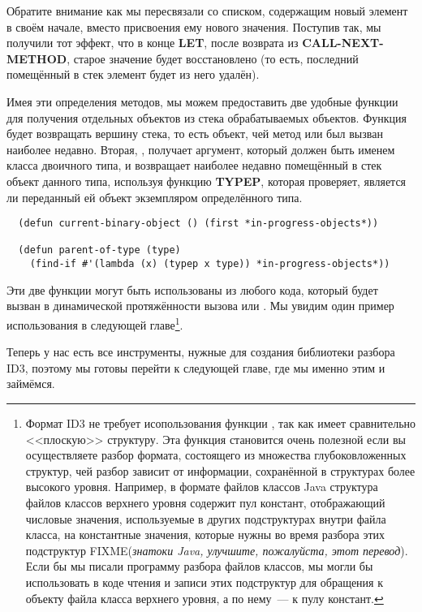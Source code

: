 Обратите внимание как мы пересвязали  со списком, содержащим
новый элемент в своём начале, вместо присвоения ему нового значения. Поступив так, мы
получили тот эффект, что в конце \textbf{LET}, после возврата из
\textbf{CALL-NEXT-METHOD}, старое значение  будет
восстановлено (то есть, последний помещённый в стек элемент будет из него удалён).

Имея эти определения методов, мы можем предоставить две удобные функции для получения
отдельных объектов из стека обрабатываемых объектов. Функция 
будет возвращать вершину стека, то есть объект, чей метод  или
 был вызван наиболее недавно. Вторая, , получает
аргумент, который должен быть именем класса двоичного типа, и возвращает наиболее недавно
помещённый в стек объект данного типа, используя функцию \textbf{TYPEP}, которая
проверяет, является ли переданный ей объект экземпляром определённого типа.

\begin{lstlisting}
  (defun current-binary-object () (first *in-progress-objects*))

  (defun parent-of-type (type)
    (find-if #'(lambda (x) (typep x type)) *in-progress-objects*))
\end{lstlisting}

Эти две функции могут быть использованы из любого кода, который будет вызван в
динамической протяжённости вызова  или . Мы увидим
один пример использования  в следующей главе\footnote{Формат
  ID3 не требует исопользования функции , так как имеет сравнительно
  <<плоскую>> структуру. Эта функция становится очень полезной если вы осуществляете
  разбор формата, состоящего из множества глубоковложенных структур, чей разбор зависит от
  информации, сохранённой в структурах более высокого уровня. Например, в формате файлов
  классов Java структура файлов классов верхнего уровня содержит пул констант,
  отображающий числовые значения, используемые в других подструктурах внутри файла класса,
  на константные значения, которые нужны во время разбора этих подструктур
  FIXME(\textit{знатоки Java, улучшите, пожалуйста, этот перевод}). Если бы мы писали
  программу разбора файлов классов, мы могли бы использовать  в коде
  чтения и записи этих подструктур для обращения к объекту файла класса верхнего уровня, а
  по нему~--- к пулу констант.}.

Теперь у нас есть все инструменты, нужные для создания библиотеки разбора ID3, поэтому мы
готовы перейти к следующей главе, где мы именно этим и займёмся.


